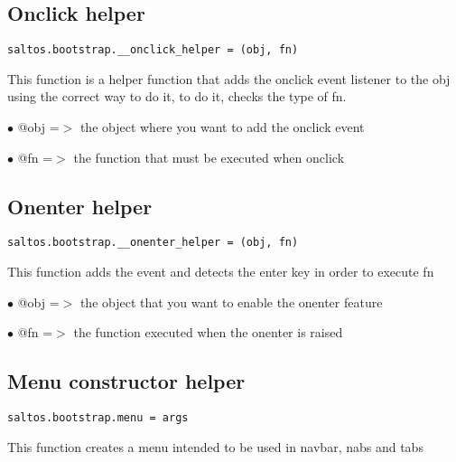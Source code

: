 \documentclass[a4paper]{book}
\begin{document}
\hypertarget{toc496}{}
\subsection{Onclick helper}

\begin{lstlisting}
saltos.bootstrap.__onclick_helper = (obj, fn)
\end{lstlisting}

This function is a helper function that adds the onclick event listener to the obj
using the correct way to do it, to do it, checks the type of fn.

\begin{compactitem}
\item[\color{myblue}$\bullet$] @obj   =$>$ the object where you want to add the onclick event
\item[\color{myblue}$\bullet$] @fn    =$>$ the function that must be executed when onclick
\end{compactitem}

\hypertarget{toc497}{}
\subsection{Onenter helper}

\begin{lstlisting}
saltos.bootstrap.__onenter_helper = (obj, fn)
\end{lstlisting}

This function adds the event and detects the enter key in order to execute fn

\begin{compactitem}
\item[\color{myblue}$\bullet$] @obj =$>$ the object that you want to enable the onenter feature
\item[\color{myblue}$\bullet$] @fn  =$>$ the function executed when the onenter is raised
\end{compactitem}

\hypertarget{toc498}{}
\subsection{Menu constructor helper}

\begin{lstlisting}
saltos.bootstrap.menu = args
\end{lstlisting}

This function creates a menu intended to be used in navbar, nabs and tabs
\end{document}
